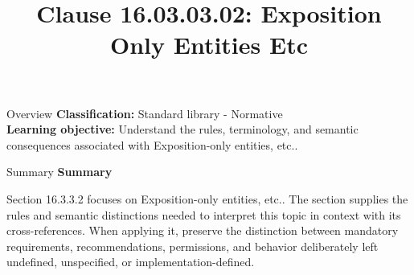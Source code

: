 \documentclass[10pt,letterpaper]{article}
\title{Clause 16.03.03.02: Exposition Only Entities Etc}
\author{}
\date{}
\begin{document}
\maketitle
\begin{CornellOverviewBox}{Overview}
\textbf{Classification:} Standard library - Normative\\[2pt]
\textbf{Learning objective:} Understand the rules, terminology, and semantic consequences associated with Exposition-only entities, etc..
\end{CornellOverviewBox}\begin{CornellSummaryBox}{Summary}
{\sffamily\bfseries\color{Accent} Summary}\par\vspace{3pt}Section 16.3.3.2 focuses on Exposition-only entities, etc.. The section supplies the rules and semantic distinctions needed to interpret this topic in context with its cross-references. When applying it, preserve the distinction between mandatory requirements, recommendations, permissions, and behavior deliberately left undefined, unspecified, or implementation-defined.
\end{CornellSummaryBox}
\end{document}
